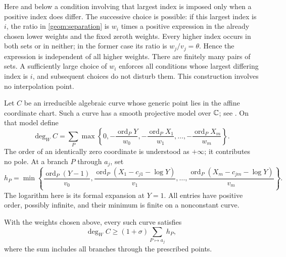 Here and below a condition involving that largest index is imposed only
when a positive index does differ. The successive choice is possible:
if this largest index is $i$, the ratio in \eqref{geom:separation} is
$w_i$ times a positive expression in the already chosen lower weights
and the fixed zeroth weights. Every higher index occurs in both sets or
in neither; in the former case its ratio is $w_j/v_j=\theta$. Hence the
expression is independent of all higher weights. There are finitely many
pairs of sets. A sufficiently large choice of $w_i$ enforces all
conditions whose largest differing index is $i$, and subsequent choices
do not disturb them. This construction involves no interpolation point.

Let $C$ be an irreducible algebraic curve whose generic point lies in the
affine coordinate chart. Such a curve has a smooth projective model over
$\mathbb C$; see \cite[Theorem~53.2.6 and Lemma~53.2.8, Tag~0BXX]{stacks}.
On that model define
\begin{equation}
\label{geom:curve-degree}
 \deg_W C=
 \sum_P\max\left\{0,-\frac{\operatorname{ord}_P Y}{w_0},
                  -\frac{\operatorname{ord}_P X_1}{w_1},\ldots,
                  -\frac{\operatorname{ord}_P X_m}{w_m}\right\}.
\end{equation}
The order of an identically zero coordinate is understood as $+\infty$;
it contributes no pole. At a branch $P$ through $a_j$, set
\begin{equation}
\label{geom:branch-contact}
 h_P=\min\left\{
 \frac{\operatorname{ord}_P(Y-1)}{v_0},
 \frac{\operatorname{ord}_P(X_1-c_{j1}-\log Y)}{v_1},\ldots,
 \frac{\operatorname{ord}_P(X_m-c_{jm}-\log Y)}{v_m}
 \right\}.
\end{equation}
The logarithm here is its formal expansion at $Y=1$. All entries have
positive order, possibly infinite, and their minimum is finite on a
nonconstant curve.

\begin{proposition}
\label{geom:curve-inequality}
With the weights chosen above, every such curve satisfies
\begin{equation}
\label{geom:curve-bound}
 \deg_W C\ge(1+\sigma)\sum_{P\mapsto a_j}h_P,
\end{equation}
where the sum includes all branches through the prescribed points.
\end{proposition}

